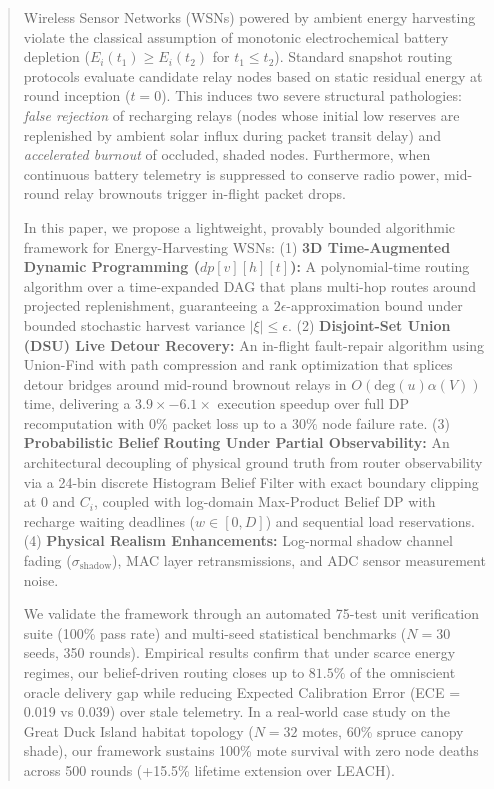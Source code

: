 \documentclass[conference]{IEEEtran}
\begin{document}
\begin{abstract}
Wireless Sensor Networks (WSNs) powered by ambient energy harvesting violate the classical assumption of monotonic electrochemical battery depletion ($E_i(t_1) \ge E_i(t_2)$ for $t_1 \le t_2$). Standard snapshot routing protocols evaluate candidate relay nodes based on static residual energy at round inception ($t=0$). This induces two severe structural pathologies: \textit{false rejection} of recharging relays (nodes whose initial low reserves are replenished by ambient solar influx during packet transit delay) and \textit{accelerated burnout} of occluded, shaded nodes. Furthermore, when continuous battery telemetry is suppressed to conserve radio power, mid-round relay brownouts trigger in-flight packet drops.

In this paper, we propose a lightweight, provably bounded algorithmic framework for Energy-Harvesting WSNs:
(1) \textbf{3D Time-Augmented Dynamic Programming ($dp[v][h][t]$):} A polynomial-time routing algorithm over a time-expanded DAG that plans multi-hop routes around projected replenishment, guaranteeing a $2\epsilon$-approximation bound under bounded stochastic harvest variance $|\xi| \le \epsilon$.
(2) \textbf{Disjoint-Set Union (DSU) Live Detour Recovery:} An in-flight fault-repair algorithm using Union-Find with path compression and rank optimization that splices detour bridges around mid-round brownout relays in $O(\text{deg}(u)\alpha(V))$ time, delivering a $3.9\times - 6.1\times$ execution speedup over full DP recomputation with $0\%$ packet loss up to a $30\%$ node failure rate.
(3) \textbf{Probabilistic Belief Routing Under Partial Observability:} An architectural decoupling of physical ground truth from router observability via a 24-bin discrete Histogram Belief Filter with exact boundary clipping at 0 and $C_i$, coupled with log-domain Max-Product Belief DP with recharge waiting deadlines ($w \in [0, D]$) and sequential load reservations.
(4) \textbf{Physical Realism Enhancements:} Log-normal shadow channel fading ($\sigma_{\text{shadow}}$), MAC layer retransmissions, and ADC sensor measurement noise.

We validate the framework through an automated 75-test unit verification suite (100\% pass rate) and multi-seed statistical benchmarks ($N=30$ seeds, 350 rounds). Empirical results confirm that under scarce energy regimes, our belief-driven routing closes up to $81.5\%$ of the omniscient oracle delivery gap while reducing Expected Calibration Error (ECE = 0.019 vs 0.039) over stale telemetry. In a real-world case study on the Great Duck Island habitat topology ($N=32$ motes, 60\% spruce canopy shade), our framework sustains 100\% mote survival with zero node deaths across 500 rounds (+15.5\% lifetime extension over LEACH).
\end{abstract}
\end{document}
